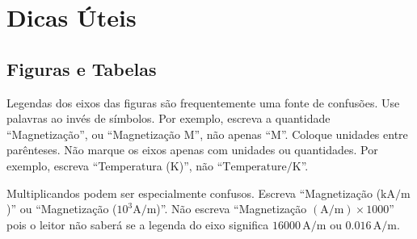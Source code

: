 \documentclass[a4paper]{ifacconf}
\begin{document}

\section{Dicas Úteis}

\subsection{Figuras e Tabelas}

Legendas dos eixos das figuras são frequentemente uma fonte de confusões. Use
palavras ao invés de símbolos. Por exemplo, escreva a quantidade ``Magnetização'',
ou ``Magnetização M'', não apenas ``M''. Coloque unidades entre parênteses. Não marque
os eixos apenas com unidades ou quantidades. Por exemplo, escreva 
``Temperatura ($\mathrm{K}$)'', não ``$\mbox{Temperature}/\mathrm{K}$''.

Multiplicandos podem ser especialmente confusos. Escreva  ``Magnetização 
($\mathrm{kA}/\mathrm{m}$)'' ou ``Magnetização ($10^3 \mathrm{A}/\mathrm{m}$)''. 
Não escreva 
``Magnetização $(\mathrm{A}/\mathrm{m}) \times 1000$'' pois o leitor não saberá
se a legenda do eixo significa 
$16000\,\mathrm{A}/\mathrm{m}$ ou $0.016\,\mathrm{A}/\mathrm{m}$.

%
\end{document}
